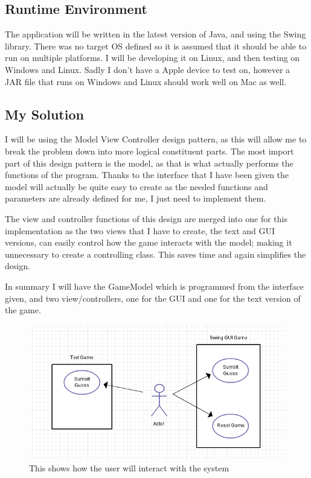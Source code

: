 \documentclass[notitlepage]{report}
\begin{document}
\subsection{Runtime Environment}
The application will be written in the latest version of Java, and using the Swing library. There was no target OS defined so it is assumed that it should be able to run on multiple platforms. I will be developing it on Linux, and then testing on Windows and Linux. Sadly I don't have a Apple device to test on, however a JAR file that runs on Windows and Linux should work well on Mac as well. 

\subsection{My Solution}
I will be using the Model View Controller design pattern, as this will allow me to break the problem down into more logical constituent parts. The most import part of this design pattern is the model, as that is what actually performs the functions of the program. Thanks to the interface that I have been given the model will actually be quite easy to create as the needed functions and parameters are already defined for me, I just need to implement them. 

The view and controller functions of this design are merged into one for this implementation as the two views that I have to create, the text and GUI versions, can easily control how the game interacts with the model; making it unnecessary to create a controlling class. This saves time and again simplifies the design. 

In summary I will have the GameModel which is programmed from the interface given, and two view/controllers, one for the GUI and one for the text version of the game. 


\begin{figure}[!htb]
  \centering
  \includegraphics[scale=0.5]{UseCaseDiagram}
  \caption{This shows how the user will interact with the system}
  \label{fig:label}
\end{figure}
\end{document}
